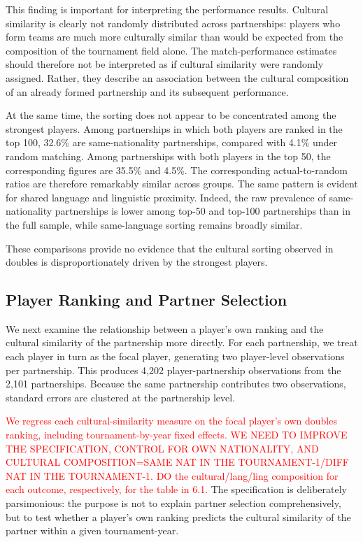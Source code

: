 \documentclass[10pt]{article}
\begin{document}
This finding is important for interpreting the performance results. Cultural similarity is clearly not randomly distributed across partnerships: players who form teams are much more culturally similar than would be expected from the composition of the tournament field alone. The match-performance estimates should therefore not be interpreted as if cultural similarity were randomly assigned. Rather, they describe an association between the cultural composition of an already formed partnership and its subsequent performance.

At the same time, the sorting does not appear to be concentrated among the strongest players. Among partnerships in which both players are ranked in the top 100, 32.6\% are same-nationality partnerships, compared with 4.1\% under random matching. Among partnerships with both players in the top 50, the corresponding figures are 35.5\% and 4.5\%. The corresponding actual-to-random ratios are therefore remarkably similar across groups. The same pattern is evident for shared language and linguistic proximity. Indeed, the raw prevalence of same-nationality partnerships is lower among top-50 and top-100 partnerships than in the full sample, while same-language sorting remains broadly similar.

These comparisons provide no evidence that the cultural sorting observed in doubles is disproportionately driven by the strongest players.

\subsection{Player Ranking and Partner Selection}

We next examine the relationship between a player's own ranking and the cultural similarity of the partnership more directly. For each partnership, we treat each player in turn as the focal player, generating two player-level observations per partnership. This produces 4,202 player-partnership observations from the 2,101 partnerships. Because the same partnership contributes two observations, standard errors are clustered at the partnership level.

\textcolor{red}{We regress each cultural-similarity measure on the focal player's own doubles ranking, including tournament-by-year fixed effects. WE NEED TO IMPROVE THE SPECIFICATION, CONTROL FOR OWN NATIONALITY, AND CULTURAL COMPOSITION=SAME NAT IN THE TOURNAMENT-1/DIFF NAT IN THE TOURNAMENT-1. DO the cultural/lang/ling composition for each outcome, respectively, for the table in 6.1.} 
The specification is deliberately parsimonious: the purpose is not to explain partner selection comprehensively, but to test whether a player's own ranking predicts the cultural similarity of the partner within a given tournament-year.
\end{document}
